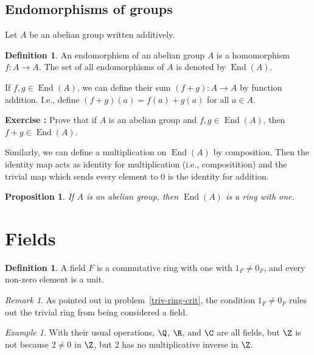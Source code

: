 \documentclass[12pt]{amsart}
\newcommand{\terminology}[1]{\textbf{\textit{#1}}}
\renewcommand{\terminology}[1]{#1}
\newcommand{\term}{\terminology}
\DeclareMathOperator{\End}{End}
\newcounter{probs}
\newenvironment{prob}{%
  \refstepcounter{probs}
  \par\medskip\noindent\textbf{Exercise \theprobs:} }{\par\medskip}
\theoremstyle{plain}
\newtheorem{prop}[thm]{Proposition}
\theoremstyle{definition}
\newtheorem{defn}[thm]{Definition}
\theoremstyle{remark}
\newtheorem*{remark}{Remark}
\newtheorem*{exam}{Example}
\begin{document}
\subsection{Endomorphisms of groups}
Let $A$ be an abelian group written additively.
\begin{defn}
  An \term{endomorphism} of an abelian group $A$ is a homomorphism
  $f:A\to A$.  The set of all endomorphisms of $A$ is denoted by $\End(A)$.
\end{defn}
If $f,g\in\End(A)$, we can define their sum $(f+g):A\to A$ by function
addition.  I.e., define $(f+g)(a) = f(a)+g(a)$ for all $a\in A$.
\begin{prob}
  Prove that if $A$ is an abelian group and $f,g\in\End(A)$, then
  $f+g\in \End(A)$.
\end{prob}
Similarly, we can define a multiplication on $\End(A)$ by
composition.  Then the identity map acts as identity for
multiplication (i.e., compositition) and the trivial map which sends
every element to $0$ is the identity for addition.
\begin{prop}
  If $A$ is an abelian group, then $\End(A)$ is a ring with one.
\end{prop}

\section{Fields}

\begin{defn}
  A \term{field} $F$ is a commutative ring with one with $1_F\neq 0_F$,
  and every non-zero element is a unit.
\end{defn}
\begin{remark}
  As pointed out in problem~\ref{triv-ring-crit}, the condition
  $1_F\neq 0_F$ rules out the trivial ring from being considered a
  field.
\end{remark}

\begin{exam}
  With their usual operations, $\Q$, $\R$, and $\C$ are all fields,
  but $\Z$ is not because $2\neq 0$ in $\Z$, but $2$ has no
  multiplicative inverse in $\Z$.
\end{exam}
\end{document}
